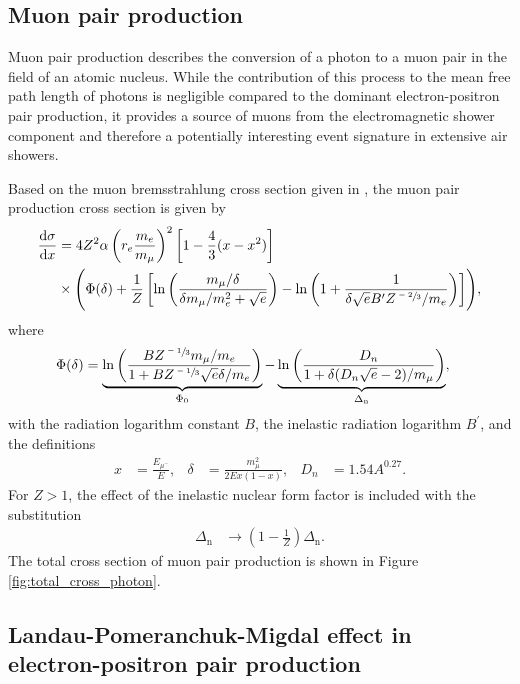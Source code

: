 \subsection{Muon pair production}

Muon pair production describes the conversion of a photon to a muon pair in the field of an atomic nucleus.
While the contribution of this process to the mean free path length of photons is negligible compared to the dominant electron-positron pair production, it provides a source of muons from the electromagnetic shower component and therefore a potentially interesting event signature in extensive air showers.

Based on the muon bremsstrahlung cross section given in \cite{Kelner:288828}, the muon pair production cross section is given by
%
\begin{align}
	\begin{split}
		\frac{\mathrm{d}\sigma}{\mathrm{d}x} &= 4 Z^2 \alpha \left( r_e \frac{m_e}{m_\mu} \right)^2 \left[ 1 - \frac{4}{3} (x - x^2) \right] \\ &\times \Biggl( \Phi(\delta) + \frac{1}{Z} \left[ \ln\left( \frac{m_\mu / \delta}{\delta m_\mu / m_e^2 + \sqrt{e}} \right) - \ln\left( 1 + \frac{1}{\delta \sqrt{e} B^\prime Z^{\sfrac{-2}{3}} / m_e} \right) \right] \Biggr),
	\end{split}
\end{align}
%
where
%
\begin{align}
	\Phi(\delta) &= \underbrace{\ln \left( \frac{B Z^{\sfrac{-1}{3}} m_\mu / m_e}{1 + B Z^{\sfrac{-1}{3}} \sqrt{e} \delta / m_e } \right)}_{\Phi_0} - \underbrace{\ln\left( \frac{D_n}{1 + \delta (D_n \sqrt{e} - 2) / m_\mu} \right)}_{\Delta_\text{n}},
\end{align}
%
with the radiation logarithm constant $B$, the inelastic radiation logarithm $B^\prime$, and the definitions
%
\begin{align}
	x &= \frac{E_{\mu^-}}{E}, & \delta &= \frac{m_\mu^2}{2 E x (1 - x)}, & D_n &= 1.54 A^{0.27}.
\end{align}
%
For $Z > 1$, the effect of the inelastic nuclear form factor is included with the substitution
%
\begin{align}
	\Delta_\text{n} &\rightarrow \left( 1 - \frac{1}{Z} \right) \Delta_\text{n}.
\end{align}
%
The total cross section of muon pair production is shown in Figure \ref{fig:total_cross_photon}.

\subsection{Landau-Pomeranchuk-Migdal effect in electron-positron pair production}

